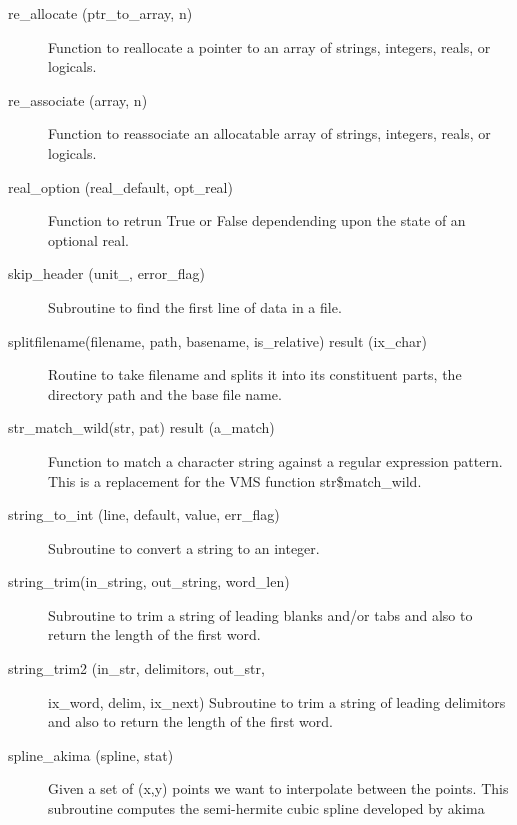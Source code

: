 \begin{description}
\label{r:re.allocate}
\item[re_allocate (ptr_to_array, n)] \Newline 
Function to reallocate a pointer to an array of strings, integers, reals, or logicals.

\label{r:re.associate}
\item[re_associate (array, n)] \Newline 
Function to reassociate an allocatable array of strings, integers, reals, or logicals.

\label{r:real.option}
\item[real_option (real_default, opt_real)] \Newline 
Function to retrun True or False dependending upon the state of an 
optional real.

\label{r:skip.header}
\item[skip_header (unit_, error_flag)] \Newline 
Subroutine to find the first line of data in a file. 

\label{r:splitfilename}
\item[splitfilename(filename, path, basename, is_relative) result (ix_char)] \Newline 
Routine to take filename and splits it into its constituent parts, 
the directory path and the base file name.  

\label{r:str.match.wild}
\item[str_match_wild(str, pat) result (a_match)] \Newline 
Function to match a character string against a regular expression pattern.
This is a replacement for the VMS function str\$match_wild.

\label{r:string.to.int}
\item[string_to_int (line, default, value, err_flag)] \Newline 
Subroutine to convert a string to an integer.

\label{r:string.trim}
\item[string_trim(in_string, out_string, word_len)] \Newline 
Subroutine to trim a string of leading blanks and/or tabs and also to return the
length of the first word.

\label{r:string.trim2}
\item[string_trim2 (in_str, delimitors, out_str,] \Newline 
                                     ix_word, delim, ix_next)
Subroutine to trim a string of leading delimitors and also to return the
length of the first word.

\label{r:spline.akima}
\item[spline_akima (spline, stat)] \Newline 
Given a set of (x,y) points we want to interpolate between the points.
This subroutine computes the semi-hermite cubic spline developed by akima


\end{description}
